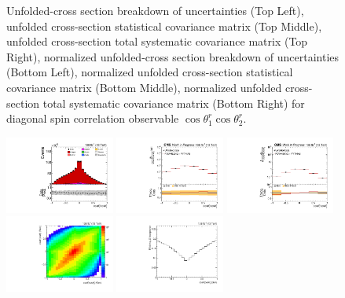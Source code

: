 \begin{figure}[htb]
\begin{center}
\caption{Unfolded-cross section breakdown of uncertainties (Top Left), unfolded cross-section statistical covariance matrix (Top Middle), unfolded cross-section total systematic covariance matrix (Top Right), normalized unfolded-cross section breakdown of uncertainties (Bottom Left), normalized unfolded cross-section statistical covariance matrix (Bottom Middle), normalized unfolded cross-section total systematic covariance matrix (Bottom Right) for diagonal spin correlation observable $\cos\theta_{1}^{r}\cos\theta_{2}^{r}$.}
\label{fig:c_rr_uncertainties}
\end{center}
\end{figure}
\clearpage
\begin{figure}[htb]
\begin{center}
 \includegraphics[width=0.32\textwidth]{fig_fullRun2UL/controlplots/combined/Hyp_LLBarCnn.pdf}
 \includegraphics[width=0.32\textwidth]{fig_fullRun2UL/unfolding/combined/UnfoldedResults_c_nn.pdf}
 \includegraphics[width=0.32\textwidth]{fig_fullRun2UL/unfolding/combined/UnfoldedResultsNorm_c_nn.pdf} \\
 \includegraphics[width=0.32\textwidth]{fig_fullRun2UL/unfolding/combined/ResponseMatrix_c_nn.pdf}
 \includegraphics[width=0.32\textwidth]{fig_fullRun2UL/unfolding/combined/TotEff_c_nn.pdf}

\end{center}
\end{figure}
